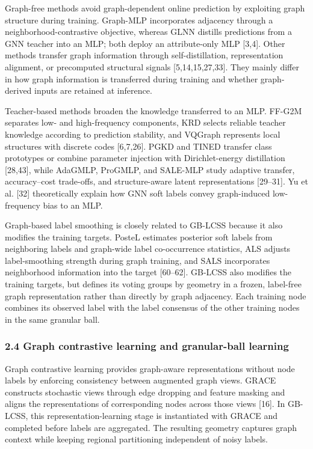 Graph-free methods avoid graph-dependent online prediction by exploiting graph structure during training. Graph-MLP incorporates adjacency through a neighborhood-contrastive objective, whereas GLNN distills predictions from a GNN teacher into an MLP; both deploy an attribute-only MLP {[}3,4{]}. Other methods transfer graph information through self-distillation, representation alignment, or precomputed structural signals {[}5,14,15,27,33{]}. They mainly differ in how graph information is transferred during training and whether graph-derived inputs are retained at inference.

Teacher-based methods broaden the knowledge transferred to an MLP. FF-G2M separates low- and high-frequency components, KRD selects reliable teacher knowledge according to prediction stability, and VQGraph represents local structures with discrete codes {[}6,7,26{]}. PGKD and TINED transfer class prototypes or combine parameter injection with Dirichlet-energy distillation {[}28,43{]}, while AdaGMLP, ProGMLP, and SALE-MLP study adaptive transfer, accuracy--cost trade-offs, and structure-aware latent representations {[}29--31{]}. Yu et al. {[}32{]} theoretically explain how GNN soft labels convey graph-induced low-frequency bias to an MLP.

Graph-based label smoothing is closely related to GB-LCSS because it also modifies the training targets. PosteL estimates posterior soft labels from neighboring labels and graph-wide label co-occurrence statistics, ALS adjusts label-smoothing strength during graph training, and SALS incorporates neighborhood information into the target {[}60--62{]}. GB-LCSS also modifies the training targets, but defines its voting groups by geometry in a frozen, label-free graph representation rather than directly by graph adjacency. Each training node combines its observed label with the label consensus of the other training nodes in the same granular ball.

\subsubsection{2.4 Graph contrastive learning and granular-ball learning}\label{graph-contrastive-learning-and-granular-ball-learning}

Graph contrastive learning provides graph-aware representations without node labels by enforcing consistency between augmented graph views. GRACE constructs stochastic views through edge dropping and feature masking and aligns the representations of corresponding nodes across those views {[}16{]}. In GB-LCSS, this representation-learning stage is instantiated with GRACE and completed before labels are aggregated. The resulting geometry captures graph context while keeping regional partitioning independent of noisy labels.

